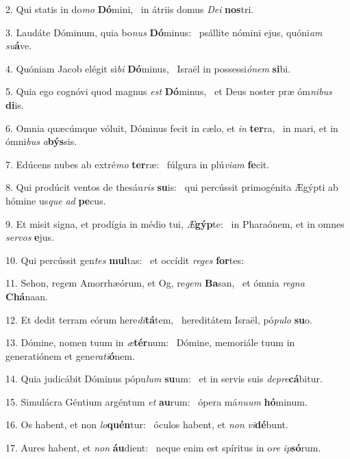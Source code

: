 2. Qui statis in do\textit{mo} \textbf{Dó}mini, \ast\  in átriis domus \textit{De}\textit{i} \textbf{nos}tri.\

3. Laudáte Dóminum, quia bo\textit{nus} \textbf{Dó}minus: \ast\  psállite nómini ejus, quóni\textit{am} \textit{su}\textbf{á}ve.\

4. Quóniam Jacob elégit si\textit{bi} \textbf{Dó}minus, \ast\  Israël in possessi\textit{ó}\textit{nem} \textbf{si}bi.\

5. Quia ego cognóvi quod magnus \textit{est} \textbf{Dó}minus, \ast\  et Deus noster præ óm\textit{ni}\textit{bus} \textbf{di}is.\

6. Omnia quæcúmque vóluit, Dóminus fecit in cælo, et \textit{in} \textbf{ter}ra, \ast\  in mari, et in ómni\textit{bus} \textit{a}\textbf{býs}sis.\

7. Edúcens nubes ab extré\textit{mo} \textbf{ter}ræ: \ast\  fúlgura in plú\textit{vi}\textit{am} \textbf{fe}cit.\

8. Qui prodúcit ventos de thesáu\textit{ris} \textbf{su}is: \ast\  qui percússit primogénita Ægýpti ab hómine us\textit{que} \textit{ad} \textbf{pe}cus.\

9. Et misit signa, et prodígia in médio tui, \textit{Æ}\textbf{gýp}te: \ast\  in Pharaónem, et in omnes \textit{ser}\textit{vos} \textbf{e}jus.\

10. Qui percússit gen\textit{tes} \textbf{mul}tas: \ast\  et occídit \textit{re}\textit{ges} \textbf{for}tes:\

11. Sehon, regem Amorrhæórum, et Og, re\textit{gem} \textbf{Ba}san, \ast\  et ómnia \textit{re}\textit{gna} \textbf{Chá}naan.\

12. Et dedit terram eórum here\textit{di}\textbf{tá}tem, \ast\  hereditátem Israël, pó\textit{pu}\textit{lo} \textbf{su}o.\

13. Dómine, nomen tuum in \textit{æ}\textbf{tér}num: \ast\  Dómine, memoriále tuum in generatiónem et gene\textit{ra}\textit{ti}\textbf{ó}nem.\

14. Quia judicábit Dóminus pópu\textit{lum} \textbf{su}um: \ast\  et in servis suis \textit{de}\textit{pre}\textbf{cá}bitur.\

15. Simulácra Géntium argéntum \textit{et} \textbf{au}rum: \ast\  ópera má\textit{nu}\textit{um} \textbf{hó}minum.\

16. Os habent, et non \textit{lo}\textbf{quén}tur: \ast\  óculos habent, et \textit{non} \textit{vi}\textbf{dé}bunt.\

17. Aures habent, et \textit{non} \textbf{áu}dient: \ast\  neque enim est spíritus in o\textit{re} \textit{ip}\textbf{só}rum.\

